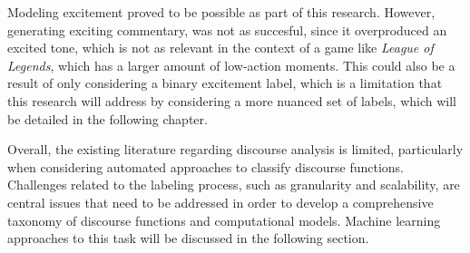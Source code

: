 \medskip 

Modeling excitement proved to be possible as part of this research. However, generating exciting commentary, was not as succesful, since it overproduced an excited tone, which is not as relevant in the context of a game like \textit{League of Legends}, which has a larger amount of low-action moments. This could also be a result of only considering a binary excitement label, which is a limitation that this research will address by considering a more nuanced set of labels, which will be detailed in the following chapter. 

\medskip 

Overall, the existing literature regarding discourse analysis is limited, particularly when considering automated approaches to classify discourse functions. Challenges related to the labeling process, such as granularity and scalability, are central issues that need to be addressed in order to develop a comprehensive taxonomy of discourse functions and computational models. Machine learning approaches to this task will be discussed in the following section.